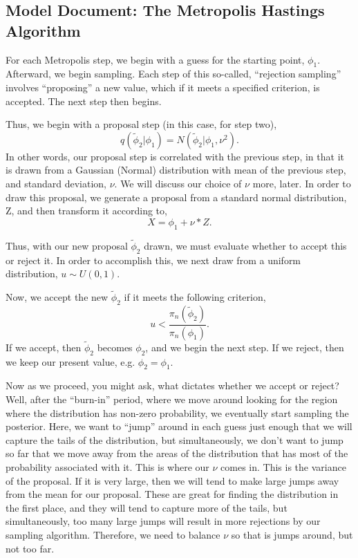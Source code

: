 \documentclass{article}
\begin{document}
\subsection{Model Document: The Metropolis Hastings Algorithm}

For each Metropolis step, we begin with a guess for the starting point,
$\phi_1$. Afterward, we begin sampling. Each step of this so-called,
``rejection sampling'' involves ``proposing'' a new value, which if it
meets a specified criterion, is accepted. The next step then begins. 

Thus, we begin with a proposal step (in this case, for step two),
\begin{equation}
 q(\tilde \phi_2 | \phi_1) = N(\tilde \phi_2 | \phi_1, \nu^2).
\end{equation}
In other words, our proposal step is correlated with the previous step,
in that it is drawn from a Gaussian (Normal) distribution with mean of
the previous step, and standard deviation, $\nu$. We will discuss our
choice of $\nu$ more, later. In order to draw this proposal, we generate a 
proposal from a standard normal distribution, Z, and then transform it according to,
\begin{equation}
 X = \phi_1 + \nu*Z.
\end{equation}

Thus, with our new proposal $\tilde \phi_2$ drawn, we must evaluate
whether to accept this or reject it. In order to accomplish this, we
next draw from a uniform distribution, $u \sim U(0,1)$. 

Now, we accept the new $\tilde \phi_2$ if it meets the following
criterion, 
\begin{equation}
u < \frac{\pi_n(\tilde \phi_2)}{\pi_n(\phi_1)}. 
\end{equation}
If we accept, then $\tilde \phi_2$ becomes $\phi_2$, and we begin the
next step. If we reject, then we keep our present value, e.g. $\phi_2 =
\phi_1$. 

Now as we proceed, you might ask, what dictates whether we accept or
reject? Well, after the ``burn-in'' period, where we move around looking
for the region where the distribution has non-zero probability, we
eventually start sampling the posterior. Here, we want to ``jump''
around in each guess just enough that we will capture the tails of the
distribution, but simultaneously, we don't want to jump so far that we
move away from the areas of the distribution that has most of the
probability associated with it. This is where our $\nu$ comes in. This
is the variance of the proposal. If it is very large, then we will tend
to make large jumps away from the mean for our proposal. These are great
for finding the distribution in the first place, and they will tend to
capture more of the tails, but simultaneously, too many large jumps will
result in more rejections by our sampling algorithm. Therefore, we need
to balance $\nu$ so that is jumps around, but not too far.
\end{document}
